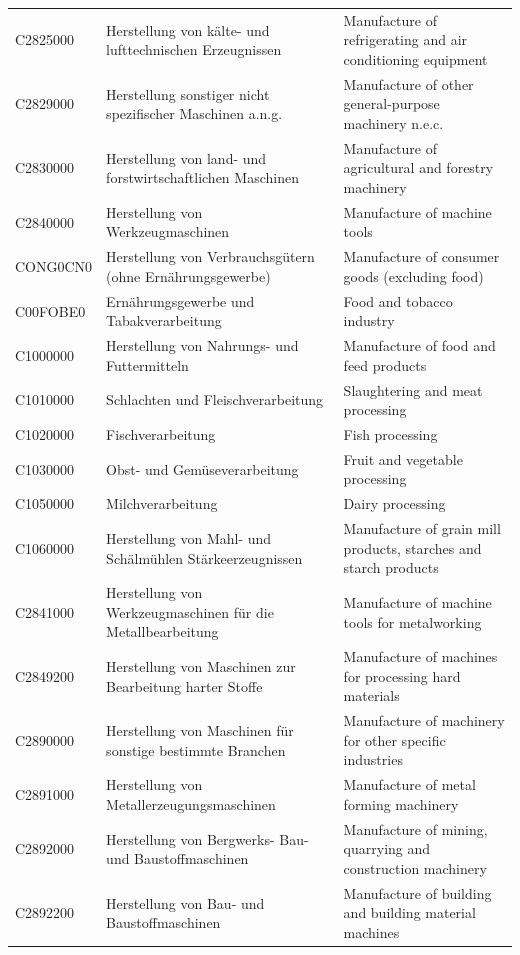 \begin{longtable}{|p{3cm}|p{6cm}|p{6cm}|}
 C2825000   & Herstellung von kälte- und lufttechnischen Erzeugnissen   & Manufacture of refrigerating and air conditioning equipment    \\
 C2829000   & Herstellung sonstiger nicht spezifischer Maschinen a.n.g.   & Manufacture of other general-purpose machinery n.e.c.    \\
 C2830000   & Herstellung von land- und forstwirtschaftlichen Maschinen   & Manufacture of agricultural and forestry machinery    \\
 C2840000   & Herstellung von Werkzeugmaschinen   & Manufacture of machine tools    \\
 CONG0CN0   & Herstellung von Verbrauchsgütern (ohne Ernährungsgewerbe)   & Manufacture of consumer goods (excluding food)    \\
 C00FOBE0   & Ernährungsgewerbe und Tabakverarbeitung   & Food and tobacco industry    \\
 C1000000   & Herstellung von Nahrungs- und Futtermitteln   & Manufacture of food and feed products    \\
 C1010000   & Schlachten und Fleischverarbeitung   & Slaughtering and meat processing    \\
 C1020000   & Fischverarbeitung   & Fish processing    \\
 C1030000   & Obst- und Gemüseverarbeitung   & Fruit and vegetable processing    \\
 C1050000   & Milchverarbeitung   & Dairy processing    \\
 C1060000   & Herstellung von Mahl- und Schälmühlen Stärkeerzeugnissen   & Manufacture of grain mill products, starches and starch products    \\
 C2841000   & Herstellung von Werkzeugmaschinen für die Metallbearbeitung   & Manufacture of machine tools for metalworking    \\
 C2849200   & Herstellung von Maschinen zur Bearbeitung harter Stoffe   & Manufacture of machines for processing hard materials    \\
 C2890000   & Herstellung von Maschinen für sonstige bestimmte Branchen   & Manufacture of machinery for other specific industries    \\
 C2891000   & Herstellung von Metallerzeugungsmaschinen   & Manufacture of metal forming machinery    \\
 C2892000   & Herstellung von Bergwerks- Bau- und Baustoffmaschinen   & Manufacture of mining, quarrying and construction machinery    \\
 C2892200   & Herstellung von Bau- und Baustoffmaschinen   & Manufacture of building and building material machines    \\

\end{longtable}
